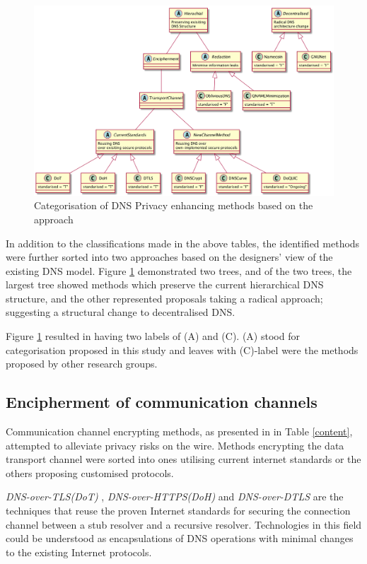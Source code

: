 \begin{figure}[h!]
    \begin{center}
    \includegraphics*[width=1\columnwidth]{img/dnsprivacy-classification}
    \end{center}
    \caption{Categorisation of DNS Privacy enhancing methods based on the approach}
    \label{dns-methods-classification}
\end{figure}

In addition to the classifications made in the above tables, the identified methods were further sorted into two approaches based on the designers' view of the existing DNS model.
Figure \ref{dns-methods-classification} demonstrated two trees, and of the two trees, the largest tree showed methods which preserve the current hierarchical DNS structure, and the other represented proposals taking a radical approach; suggesting a structural change to decentralised DNS.

Figure \ref{dns-methods-classification} resulted in having two labels of (A) and (C). (A) stood for categorisation proposed in this study and leaves with (C)-label were the methods proposed by other research groups.  

\subsection{Encipherment of communication channels}
Communication channel encrypting methods, as presented in in Table \ref{content}, attempted to alleviate privacy risks on the wire.
Methods encrypting the data transport channel were sorted into ones utilising current internet standards or the others proposing customised protocols.

\textit{DNS-over-TLS(DoT)} \cite{rfc7858}, \textit{DNS-over-HTTPS(DoH)} \cite{rfc8484} and \textit{DNS-over-DTLS} \cite{rfc8094} are the techniques that reuse the proven Internet standards for securing the connection channel between a stub resolver and a recursive resolver.
Technologies in this field could be understood as encapsulations of DNS operations with minimal changes to the existing Internet protocols.

